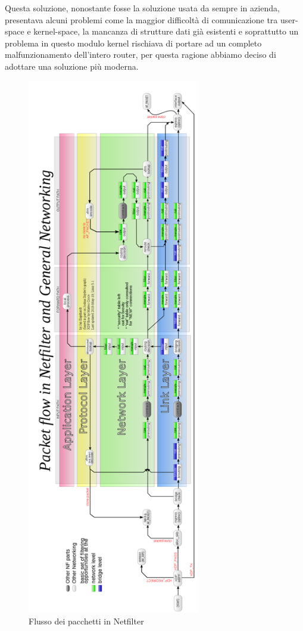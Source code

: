Questa soluzione, nonostante fosse la soluzione usata da sempre in azienda, presentava alcuni problemi come la maggior difficoltà di comunicazione tra user-space e kernel-space, la mancanza di strutture dati già esistenti e soprattutto un problema in questo modulo kernel rischiava di portare ad un completo malfunzionamento dell'intero router, per questa ragione abbiamo deciso di adottare una soluzione più moderna.



\begin{figure}[hbtp]
    \label{fig:netfilter}
    \begin{center}
        \includegraphics[height=670pt]{images/mitigazione/netfilter.png}
    \end{center}

    \caption{Flusso dei pacchetti in Netfilter}
    \centering
\end{figure}  


